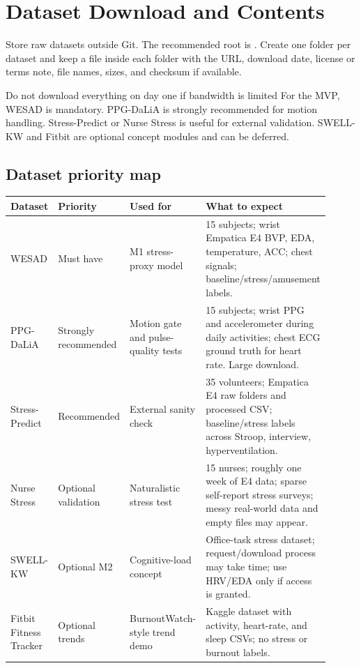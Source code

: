 \documentclass[11pt,a4paper]{article}
\newcommand{\code}{\path}
\begin{document}
\section{Dataset Download and Contents}

Store raw datasets outside Git. The recommended root is \code{data/external/}. Create one folder per
dataset and keep a \code{SOURCE.txt} file inside each folder with the URL, download date, license or
terms note, file names, sizes, and checksum if available.

\begin{warningbox}{Do not download everything on day one if bandwidth is limited}
For the MVP, WESAD is mandatory. PPG-DaLiA is strongly recommended for motion handling. Stress-Predict
or Nurse Stress is useful for external validation. SWELL-KW and Fitbit are optional concept modules
and can be deferred.
\end{warningbox}

\subsection{Dataset priority map}

\begin{longtable}{P{0.17\linewidth}P{0.16\linewidth}P{0.16\linewidth}P{0.42\linewidth}}
\toprule
\textbf{Dataset} & \textbf{Priority} & \textbf{Used for} & \textbf{What to expect} \\
\midrule
WESAD & Must have & M1 stress-proxy model & 15 subjects; wrist Empatica E4 BVP, EDA, temperature, ACC; chest signals; baseline/stress/amusement labels. \\
PPG-DaLiA & Strongly recommended & Motion gate and pulse-quality tests & 15 subjects; wrist PPG and accelerometer during daily activities; chest ECG ground truth for heart rate. Large download. \\
Stress-Predict & Recommended & External sanity check & 35 volunteers; Empatica E4 raw folders and processed CSV; baseline/stress labels across Stroop, interview, hyperventilation. \\
Nurse Stress & Optional validation & Naturalistic stress test & 15 nurses; roughly one week of E4 data; sparse self-report stress surveys; messy real-world data and empty files may appear. \\
SWELL-KW & Optional M2 & Cognitive-load concept & Office-task stress dataset; request/download process may take time; use HRV/EDA only if access is granted. \\
Fitbit Fitness Tracker & Optional trends & BurnoutWatch-style trend demo & Kaggle dataset with activity, heart-rate, and sleep CSVs; no stress or burnout labels. \\
\bottomrule
\end{longtable}
\end{document}
